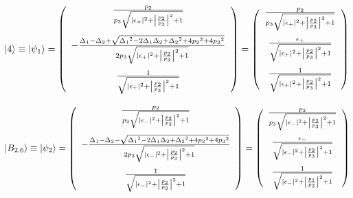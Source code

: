 \begin{equation}
     \ket{4}\equiv\ket{\psi_1}=\left(
        \begin{array}{c}
       \frac{{p_2}}{{p_3}\sqrt{
       |\epsilon_{+}|^2
       +\left|\frac{{p_2}}{{p_3}}\right|^2+1}}\\[20pt]
       -\frac{{\Delta_1}-{\Delta_2}+\sqrt{{\Delta_1}^2-2{\Delta_1}{\Delta_2}+{\Delta_2}^2+4{p_2}^2+4{p_3}^2}}{2{p_3}\sqrt{
       |\epsilon_{+}|^2
       +\left|\frac{{p_2}}{{p_3}}\right|^2+1}}\\[20pt]
       \frac{1}{\sqrt{
       |\epsilon_{+}|^2
       +\left|\frac{{p_2}}{{p_3}}\right|^2+1}}
        \end{array}
        \right)
        =\left(
        \begin{array}{c}
       \frac{{p_2}}{{p_3}\sqrt{
       |\epsilon_{+}|^2
       +\left|\frac{{p_2}}{{p_3}}\right|^2+1}}\\[20pt]
       \frac{\epsilon_+}{
       \sqrt{
       |\epsilon_{+}|^2
       +\left|\frac{{p_2}}{{p_3}}\right|^2+1}}\\[20pt]
       \frac{1}{\sqrt{
       |\epsilon_{+}|^2
       +\left|\frac{{p_2}}{{p_3}}\right|^2+1}}
        \end{array}
        \right)
\end{equation}

\begin{equation}
     \ket{B_{2,6}}\equiv\ket{\psi_2}=\left(
        \begin{array}{c}
       \frac{{p_2}}{{p_3}\sqrt{
       |\epsilon_{-}|^2
       +\left|\frac{{p_2}}{{p_3}}\right|^2+1}}\\[20pt]
       -\frac{{\Delta_1}-{\Delta_2}-\sqrt{{\Delta_1}^2-2{\Delta_1}{\Delta_2}+{\Delta_2}^2+4{p_2}^2+4{p_3}^2}}{2{p_3}\sqrt{
       |\epsilon_{-}|^2
       +\left|\frac{{p_2}}{{p_3}}\right|^2+1}}\\[20pt]
       \frac{1}{\sqrt{
       |\epsilon_{-}|^2
       +\left|\frac{{p_2}}{{p_3}}\right|^2+1}}\\[10pt]
        \end{array}
        \right)
    =\left(
        \begin{array}{c}
       \frac{{p_2}}{{p_3}\sqrt{
       |\epsilon_{-}|^2
       +\left|\frac{{p_2}}{{p_3}}\right|^2+1}}\\[20pt]
       \frac{
       \epsilon_-
       }{\sqrt{
       |\epsilon_{-}|^2
       +\left|\frac{{p_2}}{{p_3}}\right|^2+1}}\\[20pt]
       \frac{1}{\sqrt{
       |\epsilon_{-}|^2
       +\left|\frac{{p_1}}{{p_3}}\right|^2+1}}\\[10pt]
        \end{array}
        \right)
\end{equation}

